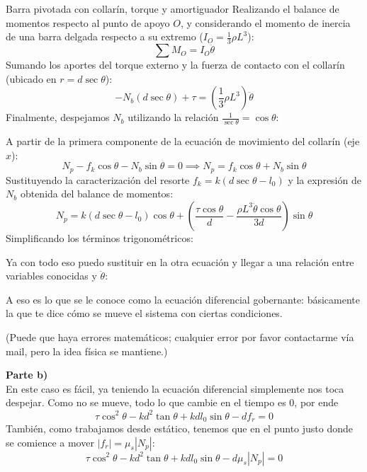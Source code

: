 \begin{solucion}{Barra pivotada con collarín, torque y amortiguador}
Realizando el balance de momentos respecto al punto de apoyo $O$, y considerando el momento de inercia de una barra delgada respecto a su extremo ($I_O = \frac{1}{3} \rho L^3$):
$$\sum M_O = I_O \ddot{\theta}$$
Sumando los aportes del torque externo y la fuerza de contacto con el collarín (ubicado en $r = d \sec \theta$):
$$-N_b (d \sec \theta) + \tau = \left( \frac{1}{3} \rho L^3 \right) \ddot{\theta}$$
Finalmente, despejamos $N_b$ utilizando la relación $\frac{1}{\sec \theta} = \cos \theta$:

A partir de la primera componente de la ecuación de movimiento del collarín (eje $x$):
$$N_p - f_k \cos \theta - N_b \sin \theta = 0 \implies N_p = f_k \cos \theta + N_b \sin \theta$$
Sustituyendo la caracterización del resorte $f_k = k(d \sec \theta - l_0)$ y la expresión de $N_b$ obtenida del balance de momentos:
$$N_p = k(d \sec \theta - l_0) \cos \theta + \left( \frac{\tau \cos \theta}{d} - \frac{\rho L^3 \ddot{\theta} \cos \theta}{3d} \right) \sin \theta$$
Simplificando los términos trigonométricos:

Ya con todo eso puedo sustituir en la otra ecuación y llegar a una relación entre variables conocidas y $\ddot\theta$:

A eso es lo que se le conoce como la ecuación diferencial gobernante: básicamente la que te dice cómo se mueve el sistema con ciertas condiciones.

(Puede que haya errores matemáticos; cualquier error por favor contactarme vía mail, pero la idea física se mantiene.)

\textbf{Parte b)}\\
En este caso es fácil, ya teniendo la ecuación diferencial simplemente nos toca despejar. Como no se mueve, todo lo que cambie en el tiempo es 0, por ende
$$\tau \cos^2 \theta - k d^2 \tan \theta + k d l_0 \sin \theta - d f_r =0$$
También, como trabajamos desde estático, tenemos que en el punto justo donde se comience a mover $|f_r| = \mu_s |N_p|$:
$$\tau \cos^2 \theta - k d^2 \tan \theta + k d l_0 \sin \theta - d \mu_s |N_p| =0$$


\end{solucion}
